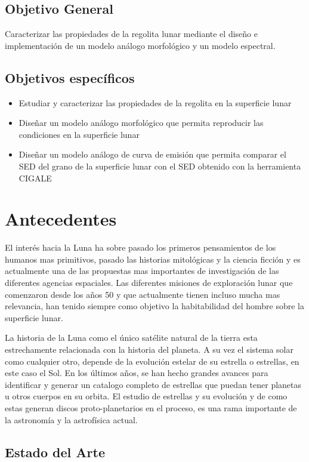 \documentclass[12pt]{article}
\begin{document}
\subsection{Objetivo General}
Caracterizar las propiedades de la regolita lunar mediante el diseño e  implementación de un modelo análogo morfológico y un modelo espectral.

\subsection{Objetivos específicos}
\begin{itemize}
    \item Estudiar y caracterizar las propiedades de la regolita  en la superficie lunar
    \item Diseñar un modelo análogo morfológico que permita reproducir las condiciones en la superficie lunar %
    \item Diseñar un modelo análogo de curva de emisión que permita comparar el SED del grano de la superficie lunar con el SED obtenido con la herramienta CIGALE
\end{itemize}

\section{Antecedentes}
El interés hacia la Luna ha sobre pasado los primeros pensamientos de los humanos mas primitivos, pasado las historias mitológicas y la ciencia ficción y es actualmente una de las propuestas mas 
importantes de investigación de las diferentes agencias espaciales. Las diferentes misiones de exploración lunar que comenzaron desde los años 50 y que actualmente tienen incluso mucha mas relevancia, 
han tenido siempre como objetivo la habitabilidad del hombre sobre la superficie lunar. 

La historia de la Luna como el único satélite natural de la tierra esta estrechamente relacionada con la historia del planeta. A su vez el sistema solar como cualquier otro, depende de 
la evolución estelar de su estrella o estrellas, en este caso el Sol. En los últimos años, se han hecho grandes avances para identificar y generar un catalogo completo de estrellas que puedan tener planetas 
u otros cuerpos en su orbita. El estudio de estrellas y su evolución y de como estas generan discos proto-planetarios en el proceso, es una rama importante de la astronomía y la astrofísica actual.
\subsection{Estado del Arte}
\end{document}
